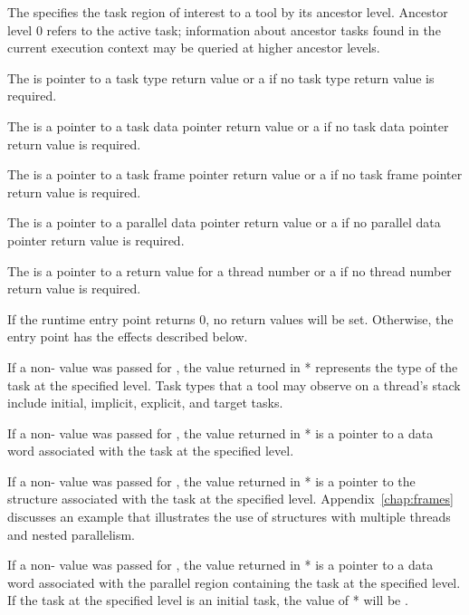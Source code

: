 The \callbackarg{}  specifies the task region
of interest to a tool by its ancestor level.  Ancestor level 0 refers
to the active task; information about
ancestor tasks found in the current execution context may be queried at
higher ancestor levels.  

The \callbackarg{}  is pointer to a task type return
value or a  if no task type return value is required.

The \callbackarg{}  is a pointer to a task data
pointer return value
or a  if no task data pointer return value is required.


The \callbackarg{}  is a pointer to a task frame
pointer return value 
or a  if no task frame pointer return value is required.

The \callbackarg{}  is a pointer to a parallel
data pointer return value 
or a  if no parallel data pointer return value is required.

The \callbackarg{}  is a pointer to a return value
for a thread number 
or a  if no thread number return value is required.

\effect


If the runtime entry point returns 0, no return values will be set.
Otherwise, the entry point has the effects described below.

If a non- value was passed for , 
the value returned in * represents the type of the task
at the specified level.  
Task types that a tool may observe on a thread's stack include
initial, implicit, explicit, and target tasks.  

If a non- value was passed for , 
the value returned in * is a pointer to a data word
associated with the task at the specified level.

If a non- value was passed for , 
the value returned in * is a pointer to the 
 structure associated with the task at the specified level.
Appendix~\ref{chap:frames} discusses an example that
illustrates the use of  structures with multiple
threads and nested parallelism.

If a non- value was passed for , 
the value returned in * is a pointer to a data word
associated with the parallel region containing the task at the specified level.  
If the task at the specified level is an initial task,
the value of * will be .

